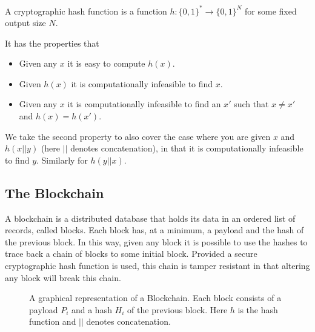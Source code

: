 \documentclass[12pt,a4paper,twoside,openright]{report}
\begin{document}
A cryptographic hash function is a function $h: \{0, 1\}^* \to \{0, 1\}^N$ for some fixed output size $N$.

It has the properties that
\begin{itemize}
\item Given any $x$ it is easy to compute $h(x)$.
\item Given $h(x)$ it is computationally infeasible to find $x$.
\item Given any $x$ it is computationally infeasible to find an $x'$ such that $x \neq x'$ and $h(x) = h(x')$.
\end{itemize}

We take the second property to also cover the case where you are given $x$ and $h(x || y)$ (here $||$ denotes concatenation), in that it is computationally infeasible to find $y$.
Similarly for $h(y || x)$.



\subsection{The Blockchain}

A blockchain is a distributed database that holds its data in an ordered list of records, called blocks.
Each block has, at a minimum, a payload and the hash of the previous block.
In this way, given any block it is possible to use the hashes to trace back a chain of blocks to some initial block.
Provided a secure cryptographic hash function is used, this chain is tamper resistant in that altering any block will break this chain.

\begin{figure}[h]
\caption[A simple blockchain]{A graphical representation of a Blockchain.
Each block consists of a payload $P_i$ and a hash $H_i$ of the previous block.
Here $h$ is the hash function and $||$ denotes concatenation.}
\label{Blockchain}
\end{figure}
\end{document}
